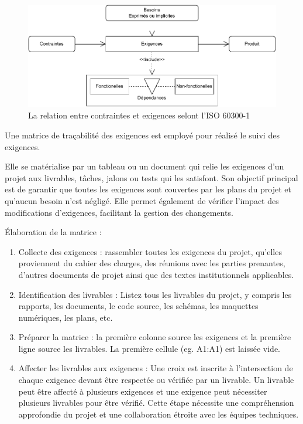 \documentclass[a4paper,12pt]{article}
\begin{document}
\begin{figure}[htbp]
\centering
\includegraphics[width=.9\linewidth]{./svg/relation-contraintes-exigences.pdf}
\caption{\label{fig:org13b1c5b}La relation entre contraintes et exigences selont l'ISO 60300-1\autocite{GestionSureteFonctionnement2014}}
\end{figure}

Une matrice de traçabilité des exigences est employé pour réalisé le suivi des exigences.

Elle se matérialise par un tableau ou un document qui relie les exigences d'un projet aux livrables, tâches, jalons ou tests qui les satisfont. Son objectif principal est de garantir que toutes les exigences sont couvertes par les plans du projet et qu'aucun besoin n'est négligé. Elle permet également de vérifier l'impact des modifications d'exigences, facilitant la gestion des changements.

Élaboration de la matrice :
\begin{enumerate}
\item Collecte des exigences : rassembler toutes les exigences du projet, qu'elles proviennent du cahier des charges, des réunions avec les parties prenantes, d'autres documents de projet ainsi que des textes institutionnels applicables.
\item Identification des livrables : Listez tous les livrables du projet, y compris les rapports, les documents, le code source, les schémas, les maquettes numériques, les plans, etc.
\item Préparer la matrice : la première colonne source les exigences et la première ligne source les livrables. La première cellule (eg. A1:A1) est laissée vide.
\item Affecter les livrables aux exigences : Une croix est inscrite à l'intersection de chaque exigence devant être respectée ou vérifiée par un livrable. Un livrable peut être affecté à plusieurs exigences et une exigence peut nécessiter plusieurs livrables pour être vérifié. Cette étape nécessite une compréhension approfondie du projet et une collaboration étroite avec les équipes techniques.
\end{enumerate}
\end{document}

